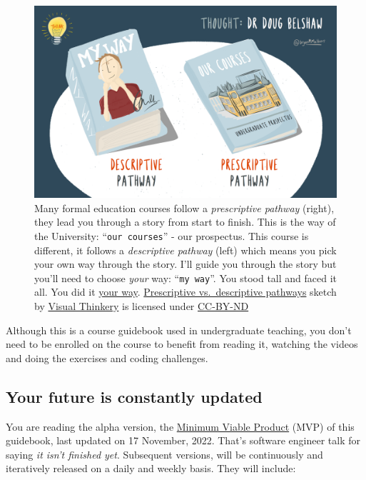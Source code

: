 \documentclass[
]{book}
\begin{document}
\begin{figure}

{\centering \includegraphics[width=1\linewidth]{images/prescriptive-vs-descriptive-pathways} 

}

\caption{Many formal education courses follow a \emph{prescriptive pathway} (right), they lead you through a story from start to finish. This is the way of the University: ``\texttt{our\ courses}'' - our prospectus. This course is different, it follows a \emph{descriptive pathway} (left) which means you pick your own way through the story. I'll guide you through the story but you'll need to choose \emph{your} way: ``\texttt{my\ way}''. You stood tall and faced it all. You did it \href{https://en.wikipedia.org/wiki/My_Way}{your way}. \citep{sinatra} \href{https://bryanmmathers.com/prescriptive-vs-descriptive-pathways/}{Prescriptive vs.~descriptive pathways} sketch by \href{https://visualthinkery.com/}{Visual Thinkery} is licensed under \href{https://creativecommons.org/licenses/by-nd/4.0/}{CC-BY-ND}}\label{fig:descriptive-fig}
\end{figure}



Although this is a course guidebook used in undergraduate teaching, you don't need to be enrolled on the course to benefit from reading it, watching the videos and doing the exercises and coding challenges.

\hypertarget{version}{%
\subsection{Your future is constantly updated}\label{version}}

You are reading the alpha version, the \href{https://en.wikipedia.org/wiki/Minimum_viable_product}{Minimum Viable Product} (MVP) of this guidebook, last updated on 17 November, 2022. That's software engineer talk for saying \emph{it isn't finished yet}. Subsequent versions, will be continuously and iteratively released on a daily and weekly basis. They will include:
\end{document}

